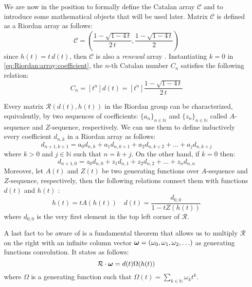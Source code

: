 We are now in the position to formally define the Catalan
array $\mathcal{C}$ and to introduce some mathematical objects
that will be used later. Matrix $\mathcal{C}$ is defined 
as a Riordan array as follows:
\begin{displaymath}
    \mathcal{C}=\left(\frac{1-\sqrt{1-4\,t}}{2\,t},
        \frac{1-\sqrt{1-4\,t}}{2}\right)
\end{displaymath}
since $h(t)=t\,d(t)$, then $\mathcal{C}$ is also a \emph{renewal} array \cite{rogers:1977}.
Instantiating $k=0$ in \autoref{eq:Riordan:array:coefficient},
the $n$-th Catalan number $C_{n}$ satisfies the following relation:
\begin{displaymath}
    C_{n} = [t^{n}]d(t)= [t^{n}]\frac{1-\sqrt{1-4\,t}}{2\,t}
\end{displaymath}

Every matrix $\mathcal{R}(d(t), h(t))$ in the Riordan group can be characterized, equivalently,
by two sequences of coefficients: $\lbrace a_{n}\rbrace_{n\in\mathbb{N}}$  and
$\lbrace z_{n}\rbrace_{n\in\mathbb{N}}$ called $A$-sequence and $Z$-sequence, 
respectively. We can use them to define inductively every coefficient $d_{n,k}$ in a Riordan array as follows:
\begin{equation}
    d_{n+1, k+1} = a_{0}d_{n,k} + a_{1}d_{n,k+1} + a_{2}d_{n,k+2} + \ldots + a_{j}d_{n,k+j} 
\end{equation}
where $k>0$ and $j\in\mathbb{N}$ such that $n=k+j$. On the other hand, if $k=0$ then:
\begin{equation}
    d_{n+1, 0} = z_{0}d_{n,0} + z_{1}d_{n,1} + z_{2}d_{n,2} + \ldots + z_{n}d_{n,n} 
\end{equation}
Moreover, let $A(t)$ and $Z(t)$ be two generating functions over $A$-sequence and $Z$-sequence, respectively,
then the following relations connect them with functions $d(t)$ and $h(t)$
\cite{merlini:some:alternative:characterizations:1997}:
\begin{equation}
    h(t) = tA(h(t)) \quad d(t)=\frac{d_{0,0}}{1-tZ(h(t))}
\end{equation}
where $d_{0,0}$ is the very first element in the top left corner of $\mathcal{R}$.

A last fact to be aware of is a fundamental theorem that allows us to multiply $\mathcal{R}$ on the right with
an infinite column vector $\boldsymbol{\omega}=(\omega_{0},\omega_{1},\omega_{2},\ldots)$ 
as generating functions convolution. It states as follows:
\begin{equation}
    \mathcal{R}\cdot\boldsymbol{\omega} = d(t)\Omega(h(t))    
\end{equation}
where $\Omega$ is a generating function such that $\Omega(t)=\sum_{k\in\mathbb{N}}{\omega_{k}t^{k}}$.

